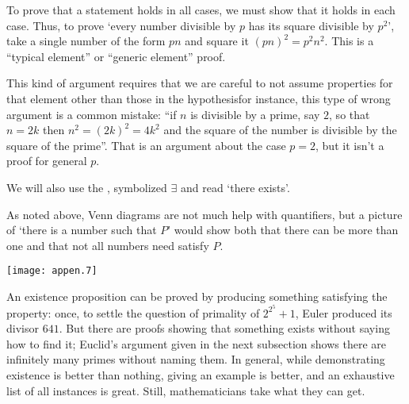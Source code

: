 To prove that a statement holds in all cases, 
we must show that it holds in each case.
Thus, to prove `every number divisible by \( p \) has its
square divisible by \( p^2 \)', take a single number of the form
\( pn \) and square it \( (pn)^2=p^2n^2 \).
This is a ``typical element'' or ``generic element'' proof.

This kind of argument requires that we are careful to not assume 
properties for that element
other than those in the hypothesis\Dash for instance, 
this type of wrong argument is a common mistake:
``if \( n \) is divisible by a prime, say \( 2 \), so that \( n=2k \)
then \( n^2=(2k)^2=4k^2 \) and the square of the number is divisible
by the square of the prime''.
That is an argument about the case \( p=2 \), but it isn't a proof for
general \( p \).



We will also use the 
,
symbolized 
\( \exists \) and read `there exists'.


As noted above, Venn diagrams are not much help with quantifiers, but a picture
of `there is a number such that \( P \)' would show both that there can be
more than one and that not all numbers need satisfy \( P \).
\begin{center}
  \texttt{[image: appen.7]}
%
\end{center}

An existence proposition can be proved by producing something satisfying
the property: once, to settle the question of primality of
\( 2^{2^5}+1 \), Euler produced its divisor \( 641 \).
But there are proofs
showing that something exists without saying how to find it;
Euclid's argument given in the next subsection
shows there are infinitely many primes without naming them.
In general, while demonstrating existence is better than nothing,
giving an example is better, and an
exhaustive list of all instances is great.
Still, mathematicians take what they can get.

